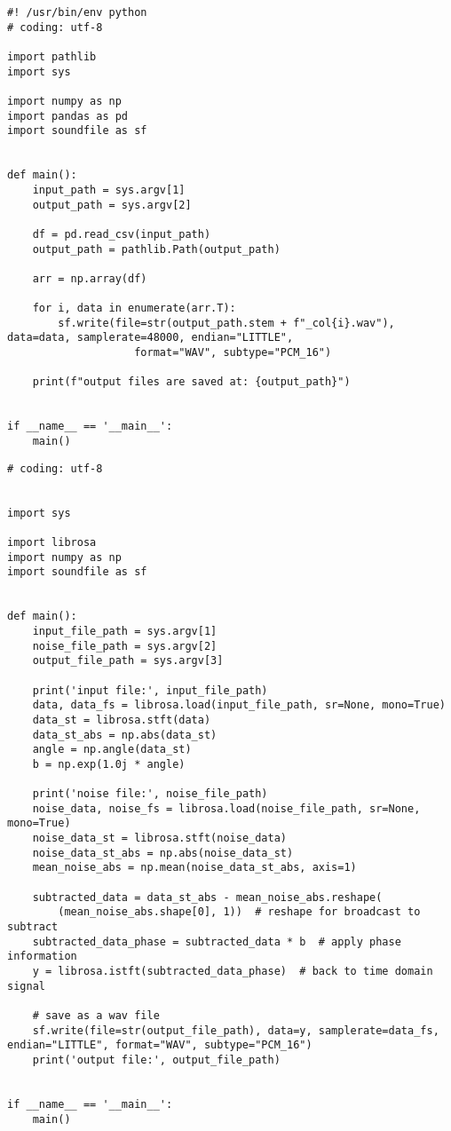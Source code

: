 \begin{lstlisting}[caption=csv\_to\_wav\_each\_column.py,label=csv_to_wav_each_column.py]
#! /usr/bin/env python
# coding: utf-8

import pathlib
import sys

import numpy as np
import pandas as pd
import soundfile as sf


def main():
    input_path = sys.argv[1]
    output_path = sys.argv[2]

    df = pd.read_csv(input_path)
    output_path = pathlib.Path(output_path)

    arr = np.array(df)

    for i, data in enumerate(arr.T):
        sf.write(file=str(output_path.stem + f"_col{i}.wav"), data=data, samplerate=48000, endian="LITTLE",
                    format="WAV", subtype="PCM_16")

    print(f"output files are saved at: {output_path}")


if __name__ == '__main__':
    main()
\end{lstlisting}

\begin{lstlisting}[caption=calc\_subtracted\_wav.py,label=calc_subtracted_wav.py]
# coding: utf-8


import sys

import librosa
import numpy as np
import soundfile as sf


def main():
    input_file_path = sys.argv[1]
    noise_file_path = sys.argv[2]
    output_file_path = sys.argv[3]

    print('input file:', input_file_path)
    data, data_fs = librosa.load(input_file_path, sr=None, mono=True)
    data_st = librosa.stft(data)
    data_st_abs = np.abs(data_st)
    angle = np.angle(data_st)
    b = np.exp(1.0j * angle)

    print('noise file:', noise_file_path)
    noise_data, noise_fs = librosa.load(noise_file_path, sr=None, mono=True)
    noise_data_st = librosa.stft(noise_data)
    noise_data_st_abs = np.abs(noise_data_st)
    mean_noise_abs = np.mean(noise_data_st_abs, axis=1)

    subtracted_data = data_st_abs - mean_noise_abs.reshape(
        (mean_noise_abs.shape[0], 1))  # reshape for broadcast to subtract
    subtracted_data_phase = subtracted_data * b  # apply phase information
    y = librosa.istft(subtracted_data_phase)  # back to time domain signal

    # save as a wav file
    sf.write(file=str(output_file_path), data=y, samplerate=data_fs, endian="LITTLE", format="WAV", subtype="PCM_16")
    print('output file:', output_file_path)


if __name__ == '__main__':
    main()

\end{lstlisting}

